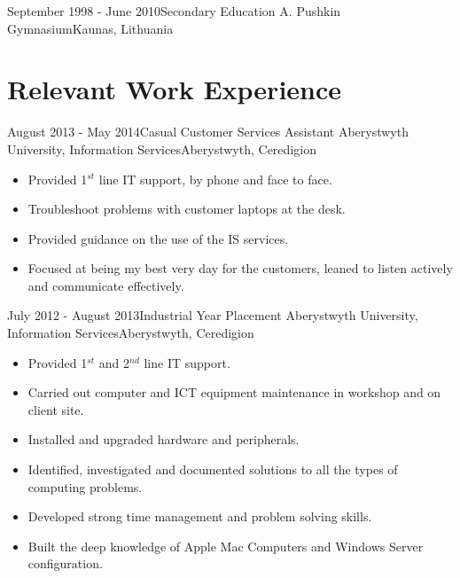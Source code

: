 \documentclass[11pt,a4paper]{moderncv}
\begin{document}
\cventry
	{September 1998 - June 2010}{Secondary Education}
	{A. Pushkin Gymnasium}{Kaunas, Lithuania}
	{}{}
		
\section{Relevant Work Experience}

\cventry
	{August 2013 - May 2014}{Casual Customer Services Assistant}
	{Aberystwyth University, Information Services}{Aberystwyth, Ceredigion}
	{}{
        \begin{itemize}
            \item Provided 1$^{st}$ line IT support, by phone and face to face.
            \item Troubleshoot problems with customer laptops at the desk.
            \item Provided guidance on the use of the IS services.
            \item Focused at being my best very day for the customers, leaned to listen actively and communicate effectively.
        \end{itemize}
    }
	
\cventry
	{July 2012 - August 2013}{Industrial Year Placement}
	{Aberystwyth University, Information Services}{Aberystwyth, Ceredigion}
	{}{
        \begin{itemize}
            \item Provided 1$^{st}$ and 2$^{nd}$ line IT support.
            \item Carried out computer and ICT equipment maintenance in workshop and on client site.
            \item Installed and upgraded hardware and peripherals.
            \item Identified, investigated and documented solutions to all the types of computing problems.
            \item Developed strong time management and problem solving skills.
            \item Built the deep knowledge of Apple Mac Computers and Windows Server configuration. 
        \end{itemize}
    }
    
\end{document}
